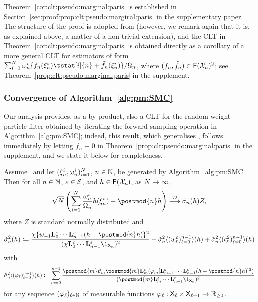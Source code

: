 Theorem~\ref{cor:clt:pseudo:marginal:paris} is established in Section~\ref{sec:proof:prop:clt:pseudo:marginal:paris} in the supplementary paper. The structure of the proof is adopted from \cite{olsson:westerborn:2017} (however, we remark again that it is, as explained above, a matter of a non-trivial extension), and the CLT in Theorem~\ref{cor:clt:pseudo:marginal:paris} is obtained directly as a corollary of a more general CLT for estimators of form $\sum_{i = 1}^\N \ewght{n}{i} \{ f_n(\epart{n}{i}) \tstat[i]{n} + \ftd{n}(\epart{n}{i}) \} / \sumwght{n}$, where $(f_n, \tilde{f}_{n}) \in \mathsf{F}(\mathcal{X}_n)^2$; see Theorem~\ref{prop:clt:pseudo:marginal:paris} in the supplement.  

\subsubsection{Convergence of Algorithm~\ref{alg:pm:SMC}} 
\label{sec:implied:convergence:results}

Our analysis provides, as a by-product, also a CLT for the random-weight particle filter obtained by iterating the forward-sampling operation in Algorithm~\ref{alg:pm:SMC}; indeed, this result, which generalises \cite[Theorem~3]{fearnhead2008particle}, follows immediately by letting $f_n \equiv 0$ in Theorem~\ref{prop:clt:pseudo:marginal:paris} in the supplement, and we state it below for completeness. 

\begin{proposition} \label{prop:clt:pseudo:marginal:filter}
Assume~ and let $(\xi_{n}^{i}, \omega_{n}^{i})_{i = 1}^N$, $n \in \mathbb{N}$, be generated by Algorithm~\ref{alg:pm:SMC}. Then for all $n \in \mathbb{N}$, $\varepsilon \in \mathcal{E}$, and $h \in \mathsf{F}(\mathcal{X}_n)$, as $N \to \infty$,
$$
 \sqrt{\N} \left( \sum_{i = 1}^\N \frac{\ewght{n}{i}}{\sumwght{n}} h(\epart{n}{i}) - \postmod{n} h \right) 
  \dlim \tilde{\sigma}_n(h) Z, 
$$
where $Z$ is standard normally distributed and
\begin{equation} \label{eq:as:var:pm:filter}
\tilde{\sigma}^2_n(h) \eqdef \frac{\chi\{ \initwgtfunc \ukmod{0} \cdots \ukmod{n - 1}(h - \postmod{n} h) \}^2}{(\chi \ukmod{0} \cdots \ukmod{n - 1} \1_{\Xset_n})^2} + \tilde{\sigma}^2_n \langle (\wgtfuncmod{\ell})_{\ell = 0}^{n - 1} \rangle (h) + \tilde{\sigma}^2_n \langle (\ukestvar{\ell})_{\ell = 0}^{n - 1} \rangle (h) 
\end{equation}
with
\begin{equation} \label{eq:non-recursive:filter:as:var}
\tilde{\sigma}^2_n \langle (\varphi_\ell)_{\ell = 0}^{n - 1} \rangle (h) 
\eqdef \sum_{m = 0}^{n - 1} \frac{\postmod{m} \adjfuncforward{m} \postmod{m} \ukmod{m}(\varphi_m [\ukmod{m + 1} \cdots \ukmod{n - 1} (h - \postmod{n} h)
]^2)}{(\postmod{m} \ukmod{m} \cdots \ukmod{n - 1} \1_{\Xset_n})^2} 
\end{equation}
for any sequence $(\varphi_\ell)_{\ell \in \mathbb{N}}$ of measurable functions $\varphi_\ell : \mathsf{X}_\ell \times \mathsf{X}_{\ell + 1} \to \mathbb{R}_{\geq 0}$. 
\end{proposition}

